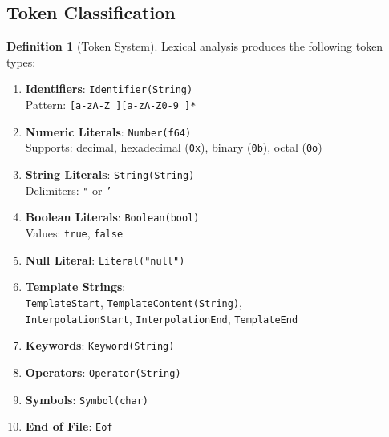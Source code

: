 \documentclass[12pt,a4paper]{article}
\theoremstyle{definition}
\newtheorem{definition}{Definition}[section]
\begin{document}
\subsection{Token Classification}

\begin{definition}[Token System]
Lexical analysis produces the following token types:

\begin{enumerate}[leftmargin=*, itemsep=5pt]
    \item \textbf{Identifiers}: \texttt{Identifier(String)} \\
    Pattern: \texttt{[a-zA-Z\_][a-zA-Z0-9\_]*}
    
    \item \textbf{Numeric Literals}: \texttt{Number(f64)} \\
    Supports: decimal, hexadecimal (\texttt{0x}), binary (\texttt{0b}), octal (\texttt{0o})
    
    \item \textbf{String Literals}: \texttt{String(String)} \\
    Delimiters: \texttt{"} or \texttt{'}
    
    \item \textbf{Boolean Literals}: \texttt{Boolean(bool)} \\
    Values: \texttt{true}, \texttt{false}
    
    \item \textbf{Null Literal}: \texttt{Literal("null")}
    
    \item \textbf{Template Strings}: \\
    \texttt{TemplateStart}, \texttt{TemplateContent(String)}, \\
    \texttt{InterpolationStart}, \texttt{InterpolationEnd}, \texttt{TemplateEnd}
    
    \item \textbf{Keywords}: \texttt{Keyword(String)}
    
    \item \textbf{Operators}: \texttt{Operator(String)}
    
    \item \textbf{Symbols}: \texttt{Symbol(char)}
    
    \item \textbf{End of File}: \texttt{Eof}
\end{enumerate}
\end{definition}
\end{document}
